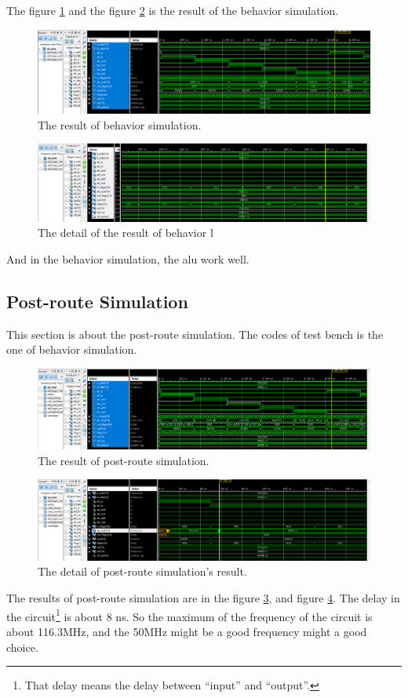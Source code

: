 \documentclass{article}
\begin{document}
The figure \ref{fig:cr-1} and the figure \ref{fig:cr-2} is the result of the behavior simulation. 
 
\begin{figure}
\centering
\includegraphics[width=0.7\linewidth]{cr-1}
\caption{The result of behavior simulation.}
\label{fig:cr-1}
\end{figure}

\begin{figure}
\centering
\includegraphics[width=0.7\linewidth]{cr-2}
\caption{The detail of the result of behavior l}
\label{fig:cr-2}
\end{figure}

And in the behavior simulation, the alu work well.


\subsection{Post-route Simulation}
\label{sec:alu:p-sim}

This section is about the post-route simulation. The codes of test bench is the one of behavior simulation.

\begin{figure}
\centering
\includegraphics[width=0.7\linewidth]{cr-3}
\caption{The result of post-route simulation.}
\label{fig:cr-3}
\end{figure}

\begin{figure}
\centering
\includegraphics[width=0.7\linewidth]{cr-4}
\caption{The detail of post-route simulation's result.}
\label{fig:cr-4}
\end{figure}

The results of post-route simulation are in the figure \ref{fig:cr-3}, and figure \ref{fig:cr-4}.
The delay in the circuit\footnote{That delay means the delay between ``input'' and ``output''.} is about 8 ns.
So the maximum of the frequency of the circuit is about 116.3MHz, and the 50MHz might be a good frequency might a good choice.
\end{document}

